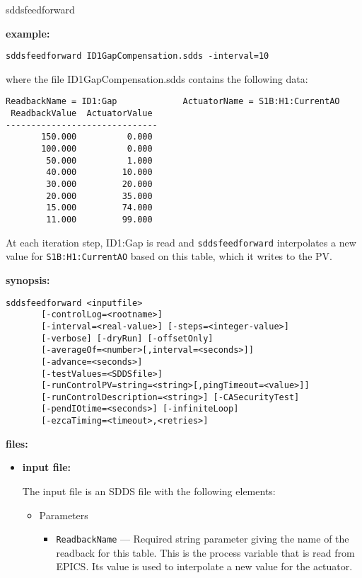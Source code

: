 \begin{sddsprog}{sddsfeedforward}
\item {\bf example:} 
%
% 
%
\begin{verbatim}
sddsfeedforward ID1GapCompensation.sdds -interval=10
\end{verbatim}
where the file ID1GapCompensation.sdds contains the following
data:
\begin{verbatim}
ReadbackName = ID1:Gap             ActuatorName = S1B:H1:CurrentAO  
 ReadbackValue  ActuatorValue 
------------------------------
       150.000          0.000 
       100.000          0.000 
        50.000          1.000 
        40.000         10.000 
        30.000         20.000 
        20.000         35.000 
        15.000         74.000 
        11.000         99.000 
\end{verbatim}
At each iteration step, ID1:Gap is read and \verb+sddsfeedforward+ interpolates a new value for
\verb+S1B:H1:CurrentAO+ based on this table, which it writes to the PV.
\item {\bf synopsis:} 
%
%
\begin{verbatim}
sddsfeedforward <inputfile>
       [-controlLog=<rootname>]
       [-interval=<real-value>] [-steps=<integer-value>]
       [-verbose] [-dryRun] [-offsetOnly]
       [-averageOf=<number>[,interval=<seconds>]]
       [-advance=<seconds>]
       [-testValues=<SDDSfile>]
       [-runControlPV=string=<string>[,pingTimeout=<value>]]
       [-runControlDescription=<string>] [-CASecurityTest]
       [-pendIOtime=<seconds>] [-infiniteLoop]
       [-ezcaTiming=<timeout>,<retries>]
\end{verbatim}
\item {\bf files:}
\begin{itemize}
\item {\bf input file:} \par
The input file is an SDDS file with the following elements:
\begin{itemize}
\item Parameters
\begin{itemize}
\item {\tt ReadbackName} --- Required string parameter giving the name of the
        readback for this table.  This is the process variable that is read from
        EPICS.  Its value is used to interpolate a new value for the actuator.

\end{itemize}
\end{itemize}
\end{itemize}
\end{sddsprog}
